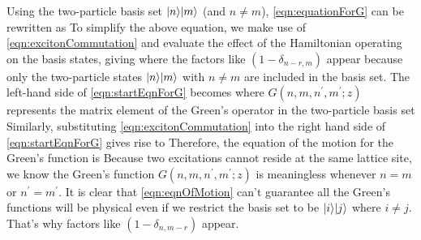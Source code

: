 Using the two-particle basis set $| n \rangle| m \rangle$ (and $n \neq m$), \autoref{eqn:equationForG} can be rewritten as
To simplify the above equation, we make use of \autoref{eqn:excitonCommutation} and evaluate the effect of the 
Hamiltonian operating on the basis states, giving
where the factors like $(1-\delta_{n-r, m})$ appear because only the two-particle states $| n \rangle| m \rangle$ with 
$n \neq m$ are included in the basis set. 
The left-hand side of \autoref{eqn:startEqnForG} becomes
where $G(n, m, n^{\prime}, m^{\prime}; z)$ represents the matrix element of the Green's operator in the two-particle 
basis set 
Similarly, substituting \autoref{eqn:excitonCommutation} into the right hand side of \autoref{eqn:startEqnForG}  gives
rise to 
Therefore, the equation of the motion for the Green's function is 
Because two excitations cannot reside at the same lattice site, we know the Green's function 
$G(n, m, n^{\prime}, m^{\prime}; z)$ is meaningless whenever $n=m$ or $n^{\prime} = m^{\prime}$. It is clear that
\autoref{eqn:eqnOfMotion} can't guarantee all the Green's functions will be physical even if we restrict
the basis set to be $| i \rangle| j \rangle$ where $i \neq j$. That's why factors like  $(1-\delta_{n, m-r})$ appear. 


